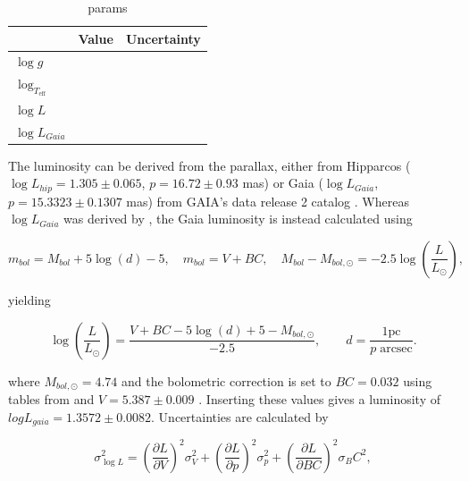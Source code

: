 \begin{table}[htbp]
\centering
\begin{tabular}{|l|ll|}
\hline
                                    & Value & Uncertainty \\ \hline
$\log g$                            &       &            \\
$\log_{T_\text{eff}}$               &       &            \\
$\log L$                            &       &            \\
$\log L_{Gaia}$                     &       &            \\ \hline
\end{tabular}

\caption{params}
\label{tab:parameters}
\end{table}

The luminosity can be derived from the parallax, either from Hipparcos ($\log L_{hip} = 1.305 \pm 0.065$, $p = 16.72 \pm 0.93$ mas) or Gaia  ($\log L_{Gaia}$, $p=15.3323 \pm 0.1307$ mas) from GAIA's data release 2 catalog \citep{clementini2017gaia, brown2018gaia}. Whereas $\log L_{Gaia}$ was derived by \citet{lenz2010delta}, the Gaia luminosity is instead calculated using 

\begin{equation}
    m_{bol} = M_{bol} + 5\log(d) - 5, \quad m_{bol} = V + BC, \quad M_{bol}- M_{bol,\odot} = -2.5\log\left(\frac{L}{L_\odot}\right),
\end{equation}

\noindent yielding

\begin{equation}
    \log\left(\frac{L}{L_\odot}\right) = \frac{V + BC - 5 \log(d) + 5-M_{bol,\odot}}{-2.5}, \qquad d = \frac{1\text{pc}}{p\;\text{arcsec}}.
\end{equation}

\noindent where $M_{bol,\odot} = 4.74$ and the bolometric correction is set to $BC = 0.032$ using tables from \citep{Flower96} and $V=5.387 \pm 0.009$ \citet{hog2000tycho}. Inserting these values gives a luminosity of $log L_{gaia} = 1.3572 \pm 0.0082$. Uncertainties are calculated by

\begin{equation}
    \sigma_{\log L}^2 = \left(\frac{\partial L}{\partial V}\right)^2 \sigma_V^2 + \left(\frac{\partial L}{\partial p}\right)^2 \sigma_p^2 + \left(\frac{\partial L}{\partial BC}\right)^2 \sigma_BC^2,
\end{equation}

